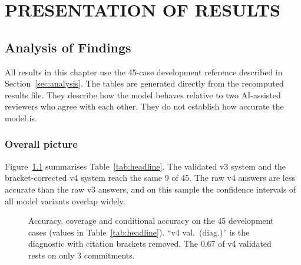 \chapter{PRESENTATION OF RESULTS}
\label{ch:results}

\section{Analysis of Findings}
\label{sec:analysisfindings}

All results in this chapter use the 45-case development reference described in Section~\ref{sec:analysis}. The tables are generated directly from the recomputed results file. They describe how the model behaves relative to two AI-assisted reviewers who agree with each other. They do not establish how accurate the model is.

\subsection{Overall picture}

Figure~\ref{fig:headline} summarises Table~\ref{tab:headline}. The validated v3 system and the bracket-corrected v4 system reach the same 9 of 45. The raw v4 answers are less accurate than the raw v3 answers, and on this sample the confidence intervals of all model variants overlap widely.

\begin{figure}[H]
\centering
{}
\caption[{Accuracy, coverage and conditional accuracy on the 45 development cases}]{Accuracy, coverage and conditional accuracy on the 45 development cases (values in Table~\ref{tab:headline}). ``v4 val.\ (diag.)'' is the diagnostic with citation brackets removed. The 0.67 of v4 validated rests on only 3 commitments.}
\label{fig:headline}
\end{figure}

